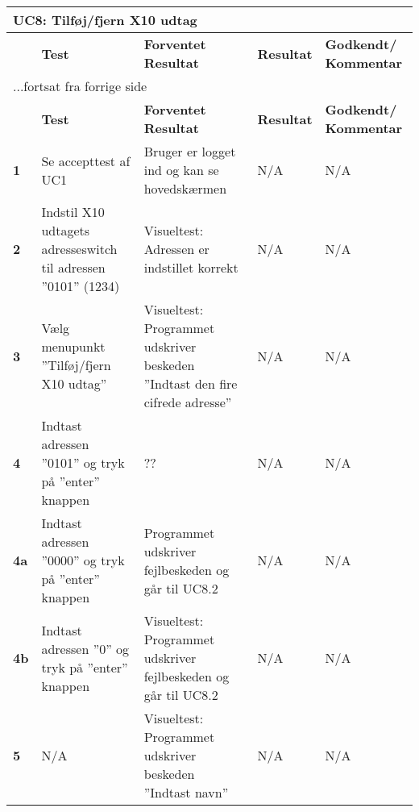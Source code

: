 
\begin{center}
\begin{longtable}{|p{}|p{}|p{}|p{}|p{}|} %
\hline
\multicolumn{5}{|l|}{\textbf{UC8: Tilføj/fjern X10 udtag}} \\ \hline
\multicolumn{1}{|c|}{} &
\textbf{Test} &
\textbf{Forventet \newline Resultat} &
\textbf{Resultat} &
\textbf{Godkendt/ \newline Kommentar} \\ \hline 
\endfirsthead

\multicolumn{5}{l}{...fortsat fra forrige side} \\ \hline 
\multicolumn{1}{|c|}{} &
\textbf{Test} &
\textbf{Forventet \newline Resultat} &
\textbf{Resultat} &
\textbf{Godkendt/ \newline Kommentar} \\ \hline 
\endhead


\textbf{1} &
Se accepttest af UC1 &
Bruger er logget ind og kan se hovedskærmen &
N/A &
N/A \\\hline

\textbf{2} &
Indstil X10 udtagets adresseswitch til adressen ''0101'' (1234) &
Visueltest: Adressen er indstillet korrekt &
N/A &
N/A \\\hline

\textbf{3} &
Vælg menupunkt ''Tilføj/fjern X10 udtag'' &
Visueltest: Programmet udskriver beskeden ''Indtast den fire cifrede adresse'' &
N/A &
N/A \\\hline

\textbf{4} &
Indtast adressen ''0101'' og tryk på ''enter'' knappen &
?? &
N/A &
N/A \\\hline

\textbf{4a} &
Indtast adressen ''0000'' og tryk på ''enter'' knappen &
Programmet udskriver fejlbeskeden og går til UC8.2 &
N/A &
N/A \\\hline

\textbf{4b} &
Indtast adressen ''0'' og tryk på ''enter'' knappen &
Visueltest: Programmet udskriver fejlbeskeden og går til UC8.2 &
N/A &
N/A \\\hline

\textbf{5} &
N/A &
Visueltest: Programmet udskriver beskeden ''Indtast navn''&
N/A &
N/A \\\hline


\end{longtable}
\end{center}
